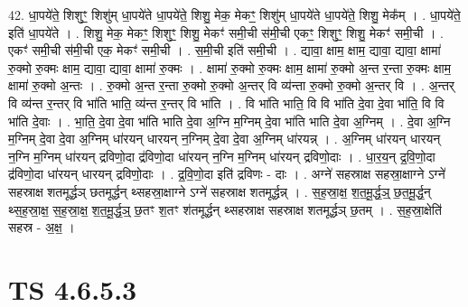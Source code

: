 \documentclass[17pt]{extarticle}
\begin{document}
42. धा॒पये॑ते॒ शिशुꣳ॒॒ शिशु॑म् धा॒पये॑ते धा॒पये॑ते॒ शिशु॒ मेक॒ मेकꣳ॒॒ शिशु॑म् धा॒पये॑ते धा॒पये॑ते॒ शिशु॒ मेक᳚म् । . धा॒पये॑ते॒ इति॑ धा॒पये॑ते । . शिशु॒ मेक॒ मेकꣳ॒॒ शिशुꣳ॒॒ शिशु॒ मेकꣳ॑ समी॒ची स॑मी॒ची एकꣳ॒॒ शिशुꣳ॒॒ शिशु॒ मेकꣳ॑ समी॒ची । . एकꣳ॑ समी॒ची स॑मी॒ची एक॒ मेकꣳ॑ समी॒ची । . स॒मी॒ची इति॑ समी॒ची । . द्यावा॒ क्षाम॒ क्षाम॒ द्यावा॒ द्यावा॒ क्षामा॑ रु॒क्मो रु॒क्मः क्षाम॒ द्यावा॒ द्यावा॒ क्षामा॑ रु॒क्मः । . क्षामा॑ रु॒क्मो रु॒क्मः क्षाम॒ क्षामा॑ रु॒क्मो अ॒न्त र॒न्ता रु॒क्मः क्षाम॒ क्षामा॑ रु॒क्मो अ॒न्तः । . रु॒क्मो अ॒न्त र॒न्ता रु॒क्मो रु॒क्मो अ॒न्तर् वि व्य॑न्ता रु॒क्मो रु॒क्मो अ॒न्तर् वि । . अ॒न्तर् वि व्य॑न्त र॒न्तर् वि भा॑ति भाति॒ व्य॑न्त र॒न्तर् वि भा॑ति । . वि भा॑ति भाति॒ वि वि भा॑ति दे॒वा दे॒वा भा॑ति॒ वि वि भा॑ति दे॒वाः । . भा॒ति॒ दे॒वा दे॒वा भा॑ति भाति दे॒वा अ॒ग्नि म॒ग्निम् दे॒वा भा॑ति भाति दे॒वा अ॒ग्निम् । . दे॒वा अ॒ग्नि म॒ग्निम् दे॒वा दे॒वा अ॒ग्निम् धा॑रयन् धारयन् न॒ग्निम् दे॒वा दे॒वा अ॒ग्निम् धा॑रयन्न् । . अ॒ग्निम् धा॑रयन् धारयन् न॒ग्नि म॒ग्निम् धा॑रयन् द्रविणो॒दा द्र॑विणो॒दा धा॑रयन् न॒ग्नि म॒ग्निम् धा॑रयन् द्रविणो॒दाः । . धा॒र॒य॒न् द्र॒वि॒णो॒दा द्र॑विणो॒दा धा॑रयन् धारयन् द्रविणो॒दाः । . द्र॒वि॒णो॒दा इति॑ द्रविणः - दाः । . अग्ने॑ सहस्राक्ष सहस्रा॒क्षाग्ने ऽग्ने॑ सहस्राक्ष शतमूर्द्धञ् छतमूर्द्धन् थ्सहस्रा॒क्षाग्ने ऽग्ने॑ सहस्राक्ष शतमूर्द्धन्न् । . स॒ह॒स्रा॒क्ष॒ श॒त॒मू॒र्द्ध॒ञ्॒ छ॒त॒मू॒र्द्ध॒न् थ्स॒ह॒स्रा॒क्ष॒ स॒ह॒स्रा॒क्ष॒ श॒त॒मू॒र्द्ध॒ञ्॒ छ॒तꣳ श॒तꣳ श॑तमूर्द्धन् थ्सहस्राक्ष सहस्राक्ष शतमूर्द्धञ् छ॒तम् । . स॒ह॒स्रा॒क्षेति॑ सहस्र - अ॒क्ष॒ । \newline
\pagebreak
{}

\section{ TS 4.6.5.3 }
\end{document}
